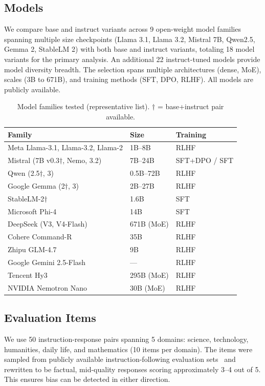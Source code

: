 \documentclass[11pt,preprint,nonatbib]{article}
\begin{document}
\subsection{Models}
We compare base and instruct variants across 9 open-weight model families spanning multiple size checkpoints (Llama 3.1, Llama 3.2, Mistral 7B, Qwen2.5, Gemma 2, StableLM 2) with both base and instruct variants, totaling 18 model variants for the primary analysis. An additional 22 instruct-tuned models provide model diversity breadth. The selection spans multiple architectures (dense, MoE), scales (3B to 671B), and training methods (SFT, DPO, RLHF). All models are publicly available.

\begin{table}[h]
\centering\small
\caption{Model families tested (representative list). $\dagger$ = base+instruct pair available.}
\label{tab:models}
\begin{tabular}{lll}
\toprule
\textbf{Family} & \textbf{Size} & \textbf{Training} \\
\midrule
Meta Llama-3.1, Llama-3.2, Llama-2 & 1B--8B & RLHF \\
Mistral (7B v0.3$\dagger$, Nemo, 3.2) & 7B--24B & SFT+DPO / SFT \\
Qwen (2.5$\dagger$, 3) & 0.5B--72B & RLHF \\
Google Gemma (2$\dagger$, 3) & 2B--27B & RLHF \\
StableLM-2$\dagger$ & 1.6B & SFT \\
Microsoft Phi-4 & 14B & SFT \\
DeepSeek (V3, V4-Flash) & 671B (MoE) & RLHF \\
Cohere Command-R & 35B & RLHF \\
Zhipu GLM-4.7 & 9B & RLHF \\
Google Gemini 2.5-Flash & --- & RLHF \\
Tencent Hy3 & 295B (MoE) & RLHF \\
NVIDIA Nemotron Nano & 30B (MoE) & RLHF \\
\bottomrule
\end{tabular}
\end{table}

\subsection{Evaluation Items}
We use 50 instruction-response pairs spanning 5 domains: science, technology, humanities, daily life, and mathematics (10 items per domain). The items were sampled from publicly available instruction-following evaluation sets~\cite{alpacaeval,zheng2023judging} and rewritten to be factual, mid-quality responses scoring approximately 3--4 out of 5. This ensures bias can be detected in either direction.
\end{document}
